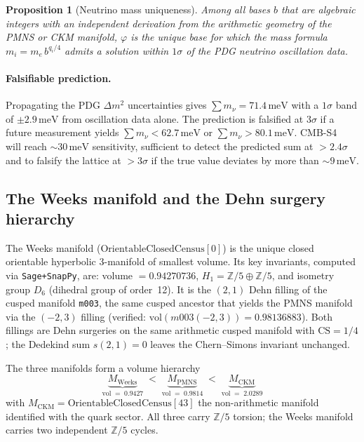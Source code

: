 \documentclass[12pt]{article}
\newtheorem{proposition}[theorem]{Proposition}
\theoremstyle{definition}
\begin{document}
\begin{proposition}[Neutrino mass uniqueness]
\label{prop:neutrino}
Among all bases $b$ that are algebraic integers with an independent
derivation from the arithmetic geometry of the PMNS or CKM manifold,
$\varphi$ is the unique base for which the mass formula
$m_i = m_e\,b^{q_i/4}$ admits a solution within $1\sigma$ of the
PDG neutrino oscillation data.
\end{proposition}

\paragraph{Falsifiable prediction.}
Propagating the PDG $\Delta m^2$ uncertainties gives
$\sum m_\nu = 71.4\,\text{meV}$ with a $1\sigma$ band of
$\pm 2.9\,\text{meV}$ from oscillation data alone.  The prediction is
falsified at $3\sigma$ if a future measurement yields
$\sum m_\nu < 62.7\,\text{meV}$ or $\sum m_\nu > 80.1\,\text{meV}$.
CMB-S4~\cite{CMBS4} will reach $\sim30\,\text{meV}$ sensitivity,
sufficient to detect the predicted sum at $>2.4\sigma$ and to
falsify the lattice at $>3\sigma$ if the true value deviates
by more than $\sim9\,\text{meV}$.


\subsection{The Weeks manifold and the Dehn surgery hierarchy}
\label{subsec:weeks}

The Weeks manifold ($\mathrm{OrientableClosedCensus}[0]$) is the unique
closed orientable hyperbolic 3-manifold of smallest volume.
Its key invariants, computed via \texttt{Sage+SnapPy}, are:
volume $= 0.94270736$, $H_1 = \mathbb{Z}/5 \oplus \mathbb{Z}/5$,
and isometry group $D_6$ (dihedral group of order~12).
It is the $(2,1)$ Dehn filling of the cusped manifold \texttt{m003},
the same cusped ancestor that yields the PMNS manifold via the $(-2,3)$
filling (verified: $\mathrm{vol}(m003(-2,3)) = 0.98136883$).
Both fillings are Dehn surgeries on the same arithmetic cusped manifold
with $\mathrm{CS} = 1/4$; the Dedekind sum $s(2,1) = 0$ leaves the
Chern--Simons invariant unchanged.

The three manifolds form a volume hierarchy
\[
\underbrace{M_\mathrm{Weeks}}_{\mathrm{vol}\;=\;0.9427}
\;<\;
\underbrace{M_\mathrm{PMNS}}_{\mathrm{vol}\;=\;0.9814}
\;<\;
\underbrace{M_\mathrm{CKM}}_{\mathrm{vol}\;=\;2.0289}
\]
with $M_\mathrm{CKM} = \mathrm{OrientableClosedCensus}[43]$ the
non-arithmetic manifold identified with the quark sector.
All three carry $\mathbb{Z}/5$ torsion; the Weeks manifold carries
two independent $\mathbb{Z}/5$ cycles.
\end{document}

